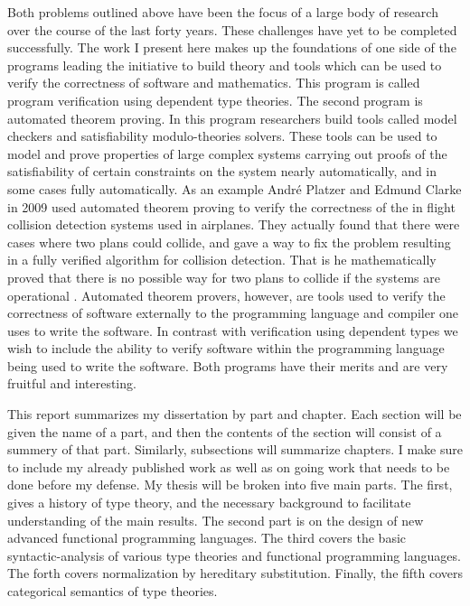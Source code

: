 Both problems outlined above have been the focus of a large body of
research over the course of the last forty years.  These challenges
have yet to be completed successfully.  The work I present here makes
up the foundations of one side of the programs leading the initiative
to build theory and tools which can be used to verify the correctness
of software and mathematics.  This program is called program
verification using dependent type theories.  The second program is
automated theorem proving.  In this program researchers build tools
called model checkers and satisfiability modulo-theories solvers.
These tools can be used to model and prove properties of large complex
systems carrying out proofs of the satisfiability of certain
constraints on the system nearly automatically, and in some cases
fully automatically.  As an example Andr\'{e} Platzer and Edmund
Clarke in 2009 used automated theorem proving to verify the
correctness of the in flight collision detection systems used in
airplanes.  They actually found that there were cases where two plans
could collide, and gave a way to fix the problem resulting in a fully
verified algorithm for collision detection.  That is he mathematically
proved that there is no possible way for two plans to collide if the
systems are operational \cite{DBLP:conf/fm/PlatzerC09}.  Automated
theorem provers, however, are tools used to verify the correctness of
software externally to the programming language and compiler one uses
to write the software.  In contrast with verification using dependent
types we wish to include the ability to verify software within the
programming language being used to write the software. Both programs
have their merits and are very fruitful and interesting.

This report summarizes my dissertation by part and chapter. Each
section will be given the name of a part, and then the contents of the
section will consist of a summery of that part.  Similarly,
subsections will summarize chapters.  I make sure to include my
already published work as well as on going work that needs to be done
before my defense.  My thesis will be broken into five main parts.
The first, gives a history of type theory, and the necessary
background to facilitate understanding of the main results. The second
part is on the design of new advanced functional programming
languages.  The third covers the basic syntactic-analysis of various
type theories and functional programming languages.  The forth covers
normalization by hereditary substitution.  Finally, the fifth covers
categorical semantics of type theories.

